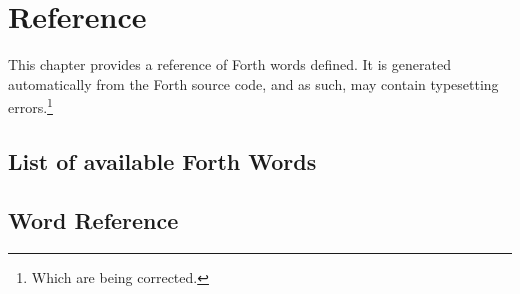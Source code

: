 \chapter{Reference}

This chapter provides a reference of Forth words defined. It is
generated automatically from the Forth source code, and as such, may
contain typesetting errors.\footnote{Which are being corrected.}

\section{List of available Forth Words}




\section{Word Reference}

\newcommand\forthvocabulary[1]{\subsection{#1 Vocabulary}}
\newcommand\forthword[1]{}
\newcommand\forthalias[1]{\def\xforthalias{#1}}
\newcommand\forthflags[1]{}
\newcommand\forthdoc[3]{
  \pagebreak[3]
  \par\noindent{{\ttfamily\textbf{#1}}}%
  \hspace{0.5em} {\ttfamily{#2}}%
  \ifthenelse{\equal{#1}{\xforthalias}}{%
    \index{#1@\protect\fwni{#1}|(pie}%
  }{%
    \index{\xforthalias@\fwni{\xforthalias}|(pie}%
    \hfill(\xforthalias)%
  }\vspace{0.5ex}%
  \\
  \noindent #3
}
\newcommand\forthcode[1]{

\noindent Defined as:
#1
}
\newcommand\forthenddef{\vspace{2ex}}



